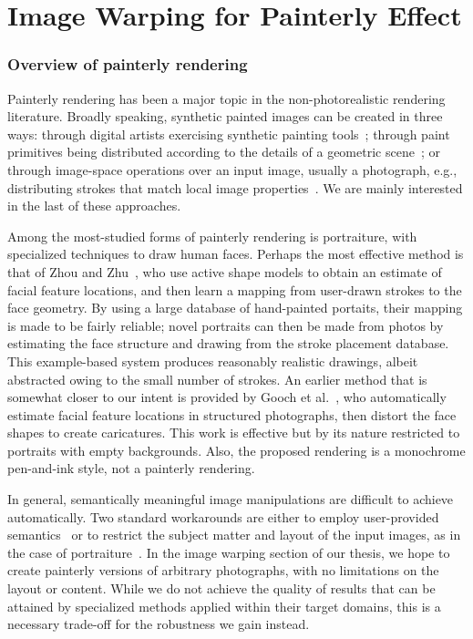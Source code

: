 \section{Image Warping for Painterly Effect}\label{bg:imagewarping}

\subsubsection{Overview of painterly rendering}
Painterly rendering has been a major topic in the non-photorealistic rendering literature. Broadly speaking, synthetic painted images can be created in three ways: through digital artists exercising synthetic painting tools~\cite{impasto,moxi}; through paint primitives being distributed according to the details of a geometric scene~\cite{meier}; or through image-space operations over an input image, usually a photograph, e.g., distributing strokes that match local image properties~\cite{Hertzmann:1998}. We are mainly interested in the last of these approaches.

Among the most-studied forms of painterly rendering is portraiture, with specialized techniques to draw human faces. Perhaps the most effective method is that of Zhou and Zhu~\cite{facepainting}, who use active shape models to obtain an estimate of facial feature locations, and then learn a mapping from user-drawn strokes to the face geometry. By using a large database of hand-painted portaits, their mapping is made to be fairly reliable; novel portraits can then be made from photos by estimating the face structure and drawing from the stroke placement database. This example-based system produces reasonably realistic drawings, albeit abstracted owing to the small number of strokes. An earlier method that is somewhat closer to our intent is provided by Gooch et al.~\cite{caricature}, who automatically estimate facial feature locations in structured photographs, then distort the face shapes to create caricatures. This work is effective but by its nature restricted to portraits with empty backgrounds. Also, the proposed rendering is a monochrome pen-and-ink style, not a painterly rendering.

In general, semantically meaningful image manipulations are difficult to achieve automatically. Two standard workarounds are either to employ user-provided semantics~\cite{sisley} or to restrict the subject matter and layout of the input images, as in the case of portraiture~\cite{caricature}. In the image warping section of our thesis, we hope to create painterly versions of arbitrary photographs, with no limitations on the layout or content. While we do not achieve the quality of results that can be attained by specialized methods applied within their target domains, this is a necessary trade-off for the robustness we gain instead. 

